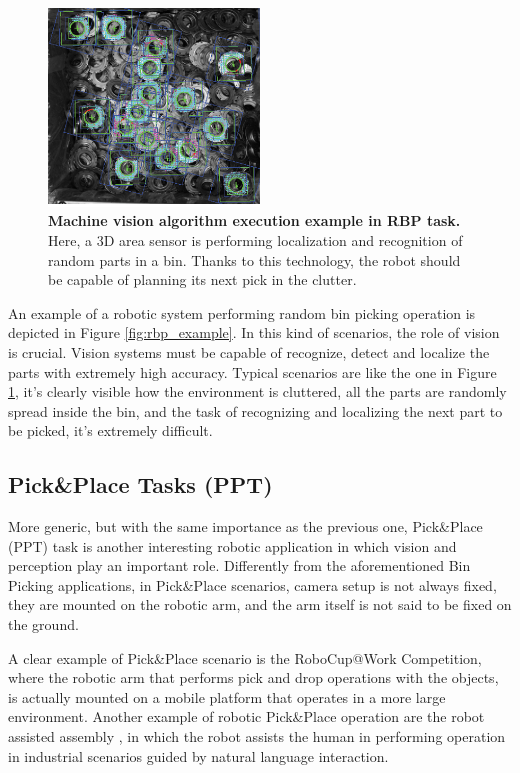 \begin{figure}
    \centering
    \includegraphics[width=0.5\textwidth]{figures/1_perception_and_sensing_in_robotics/cluttered_env_rbp}
    \caption{\textbf{Machine vision algorithm execution example in RBP task.} Here, a 3D area sensor is performing localization and recognition of random parts in a bin. Thanks to this technology, the robot should be capable of planning its next pick in the clutter.} 
    \label{fig:cluttered_env_rbp}
\end{figure}

An example of a robotic system performing random bin picking operation is depicted in Figure \ref{fig:rbp_example}. In this kind of scenarios, the role of vision is crucial. Vision systems must be capable of recognize, detect and localize the parts with extremely high accuracy. Typical scenarios are like the one in Figure \ref{fig:cluttered_env_rbp}, it's clearly visible how the environment is cluttered, all the parts are randomly spread inside the bin, and the task of recognizing and localizing the next part to be picked, it's extremely difficult. 

\subsection{Pick\&Place Tasks (PPT)}\label{subsec:pickandplace}
More generic, but with the same importance as the previous one, Pick\&Place (PPT) task is another interesting robotic application in which vision and perception play an important role. Differently from the aforementioned Bin Picking applications, in Pick\&Place scenarios, camera setup is not always fixed, they are mounted on the robotic arm, and the arm itself is not said to be fixed on the ground. 

A clear example of Pick\&Place scenario is the RoboCup@Work Competition, where the robotic arm that performs pick and drop operations with the objects, is actually mounted on a mobile platform that operates in a more large environment. Another example of robotic Pick\&Place operation are the robot assisted assembly \cite{evangelista2017grounding}, in which the robot assists the human in performing operation in industrial scenarios guided by natural language interaction.

